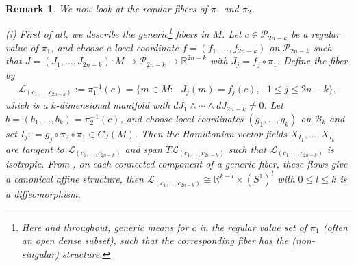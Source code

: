 \documentclass[11pt]{amsart}
\theoremstyle{definition}
\theoremstyle{plain}
\newtheorem{remark}[theorem]{Remark}
\theoremstyle{conclusion}
\begin{document}
\begin{remark}
\label{rem:fibers}
We now look at the regular fibers of $\pi_1$ and $\pi_2$.

(i) First of all, we describe the generic\footnote{Here and throughout,  \textit{generic} means for $c$ in the regular value set of $\pi_1$ (often an open dense subset), such that the corresponding fiber has the (non-singular) structure.} fibers in $M$.  Let $c \in \mathcal{P}_{2n-k}$ be a regular value of $\pi_1$, and choose a local coordinate $f= (f_1,\ldots,f_{2n-k})$ on $\mathcal{P}_{2n-k}$ such that $J = (J_1,\ldots,J_{2n-k}) : M \rightarrow \mathcal{P}_{2n-k} \rightarrow \mathbb{R}^{2n-k}$ with $J_j = f_j \circ \pi_1$.  Define the fiber by \begin{align}
    \mathcal{L}_{(c_1,\ldots,c_{2n-k})}:=\pi_1^{-1} (c) = \{m \in M : \text{ } J_j(m) = f_j(c) , \text{ } 1 \leq j \leq 2n-k\}, \label{eq:fiberpi1}
\end{align}  which is a $k$-dimensional manifold with $d J_1 \wedge \cdots \wedge d J_{2n-k} \neq 0$.  Let $b = (b_1,\ldots,b_k) = \pi_2^{-1}(c)$, and choose local coordinates $(g_1,\ldots,g_k)$ on $\mathcal{B}_k$ and set $I_j : = g_j \circ \pi_2 \circ \pi_1 \in C_J(M)$. Then the Hamiltonian vector fields $X_{I_1},\ldots,X_{I_k}$ are tangent to $ \mathcal{L}_{(c_1,\ldots,c_{2n-k})}$ and span $T \mathcal{L}_{(c_1,\ldots,c_{2n-k})}$ such that $ \mathcal{L}_{(c_1,\ldots,c_{2n-k})}$ is isotropic. From \cite{MR0365629}, on each connected component of a generic fiber, these flows give a canonical affine structure, then $ \mathcal{L}_{(c_1,\ldots,c_{2n-k})} \cong \mathbb{R}^{k-l} \times (S^1)^l$ with $ 0 \leq l \leq k$ is a diffeomorphism.   


\end{remark}
\end{document}
